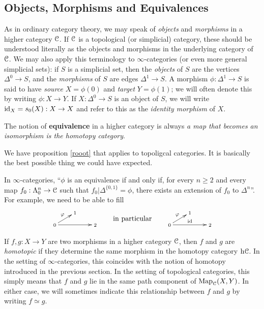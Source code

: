 \subsection{Objects, Morphisms and Equivalences}\label{obmor}
\begin{1.2.4 Objects, morphisms, equivalences}

As in ordinary category theory, we may speak of {\it objects} and {\it morphisms} in a higher category $\operatorname{\mathcal{C}}$. If $\operatorname{\mathcal{C}}$ is a topological (or simplicial) category, these
should be understood literally as the objects and morphisms in the
underlying category of $\operatorname{\mathcal{C}}$. We may also apply this terminology
to $\infty$-categories (or even more general simplicial sets): if $S$ is a simplicial set, then the {\it
objects} of $S$ are the vertices $\Delta^0 \rightarrow S$, and the {\it morphisms}
of $S$ are edges $\Delta^1 \rightarrow S$. A morphism $\phi: \Delta^1 \rightarrow S$ is said to have {\it source} $X= \phi(0)$ and {\it target} $Y= \phi(1)$;
we will often denote this by writing $\phi: X \rightarrow Y$.
If $X: \Delta^0 \rightarrow S$ is an object of $S$, we will write
$\operatorname{id}_X = s_0(X): X \rightarrow X$ and refer to this as the {\it identity morphism} of $X$.
\begin{shaded}
The notion of \textbf{equivalence} in a higher category is always \emph{a map that becomes an isomorphism is the homotopy category}.

We have proposition \ref{rooot} that applies to topoligcal categories. It is basically the best possible thing we could have expected.

In $\infty$-categories, ``$\phi$ is an equivalence if and only if, for every $n \geq 2$ and every map
$f_0: \Lambda^n_0 \rightarrow \operatorname{\mathcal{C}}$ such that $f_0 | \Delta^{\{0,1\}} = \phi$,
there exists an extension of $f_0$ to $\Delta^n$''. For example, we need to be able to fill
\[\vcenter{
\def\objectstyle{\scriptstyle}
\xymatrix@R=6mm@C=10mm@!0{
&%
1&%
\\%
0
\ar[rr]
\ar[ur]^-{\phi}&%
&%
2%
}}\textup{\qquad in particular\qquad }\vcenter{
\def\objectstyle{\scriptstyle}
\xymatrix@R=6mm@C=10mm@!0{
&%
1&%
\\%
0
\ar[rr]^{\id}
\ar[ur]^-{\phi}&%
&%
2%
}}\]
\end{shaded}

If $f,g: X \rightarrow Y$ are two morphisms in a higher category $\operatorname{\mathcal{C}}$, then $f$ and $g$
are {\it homotopic} if they determine the same morphism in the homotopy category $\rm{h} \it{\operatorname{\mathcal{C}}}$. In the setting of $\infty$-categories, this coincides with the notion of homotopy introduced in the previous section. In the setting of
topological categories, this simply means that $f$ and $g$ lie
in the same path component of $\operatorname{{Map}}_{\operatorname{\mathcal{C}}}(X,Y)$. In either case,
we will sometimes indicate this relationship between $f$ and $g$ by writing $f
\simeq g$.


\end{1.2.4 Objects, morphisms, equivalences}
